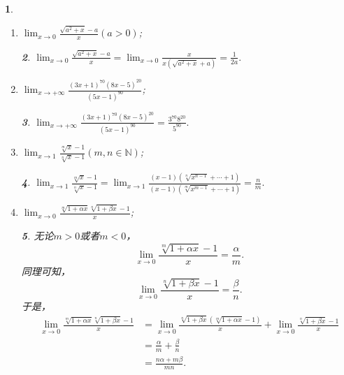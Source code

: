 \documentclass[utf8]{book}
\newtheorem{example}{}[section]             %
\newtheorem{solution}{}
\begin{document}
\begin{example}
\begin{enumerate}
\begin{solution}
同理，$\displaystyle\lim_{x\to 0}\frac{(1+mx)^{\frac{1}{n}}-1}{x}=\frac{m}{n}$.
所以，
\begin{equation*}
\begin{split}
\displaystyle\lim_{x\to 0}\frac{(1+nx)^{\frac{1}{m}}-(1+mx)^{\frac{1}{n}}}{x}&=\displaystyle\lim_{x\to 0}\frac{(1+nx)^{\frac{1}{m}}-1}{x}-\displaystyle\lim_{x\to 0}\frac{(1+mx)^{\frac{1}{n}}-1}{x}\\&=\frac{n}{m}-\frac{m}{n}\\&=\frac{n^2-m^2}{nm}.
\end{split}
\end{equation*}
\end{solution}
\item $\displaystyle\lim_{x\to 0}\frac{\sqrt{a^2+x}-a}{x}(a>0)$;
\begin{solution}
$\displaystyle\lim_{x\to 0}\frac{\sqrt{a^2+x}-a}{x}=\displaystyle\lim_{x\to 0}\frac{x}{x(\sqrt{a^2+x}+a)}=\frac{1}{2a}.$
\end{solution}
\item $\displaystyle\lim_{x\to +\infty}\frac{(3x+1)^{70}(8x-5)^{20}}{(5x-1)^{90}}$;
\begin{solution}
$\displaystyle\lim_{x\to +\infty}\frac{(3x+1)^{70}(8x-5)^{20}}{(5x-1)^{90}}=\frac{3^{70}8^{20}}{5^{90}}.$
\end{solution}
\item $\displaystyle\lim_{x\to 1}\frac{\sqrt[m]{x}-1}{\sqrt[n]{x}-1}(m,n\in\mathbb{N})$;
\begin{solution}
$\displaystyle\lim_{x\to 1}\frac{\sqrt[m]{x}-1}{\sqrt[n]{x}-1}=\displaystyle\lim_{x\to 1}\frac{(x-1)(\sqrt[n]{x^{n-1}}+\cdots+1)}{(x-1)(\sqrt[m]{x^{m-1}}+\cdots+1)}=\frac{n}{m}.$
\end{solution}
\item $\displaystyle\lim_{x\to 0}\frac{\sqrt[m]{1+\alpha x}\sqrt[n]{1+\beta x} -1}{x}$;
\begin{solution}无论$m>0$或者$m<0$，$$\displaystyle\lim_{x\to 0}\frac{\sqrt[m]{1+\alpha x}-1}{x}=\frac{\alpha}{m}.$$
同理可知，$$\displaystyle\lim_{x\to 0}\frac{\sqrt[n]{1+\beta x}-1}{x}=\frac{\beta}{n}.$$
于是，
\begin{equation*}
\begin{split}
\displaystyle\lim_{x\to 0}\frac{\sqrt[m]{1+\alpha x}\sqrt[n]{1+\beta x} -1}{x}&=
\displaystyle\lim_{x\to 0}\frac{\sqrt[n]{1+\beta x}(\sqrt[m]{1+\alpha x} -1)}{x}
+\displaystyle\lim_{x\to 0}\frac{\sqrt[n]{1+\beta x}-1}{x}\\&=\frac{\alpha}{m}+\frac{\beta}{n}\\&=\frac{n\alpha+m\beta}{mn}.

\end{split}
\end{equation*}
\end{solution}
\end{enumerate}
\end{example}
\end{document}
